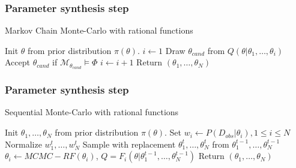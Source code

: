 \documentclass{beamer}
\begin{document}
\begin{frame}
    \frametitle{Parameter synthesis step}
    \begin{algorithm}[H]
        \caption{Markov Chain Monte-Carlo with rational functions}
        \label{rf-mcmc-alg}
        \begin{algorithmic}[1]
            \State Init $\theta$ from prior distribution $\pi(\theta)$.
            \State $i \leftarrow 1$
            \State Draw $\theta_{cand}$ from $Q(\theta|\theta_1,\ldots,\theta_i)$
            \State Accept $\theta_{cand}$ if $\mathcal{M}_{\theta_{cand}} \models \Phi$
            \State $i \leftarrow i + 1$
            \EndIf
            \EndWhile
            \State Return $(\theta_1,\ldots,\theta_N)$
            \EndProcedure
        \end{algorithmic}
    \end{algorithm}
\end{frame}


\begin{frame}
    \frametitle{Parameter synthesis step}
    \begin{algorithm}[H]
        \caption{Sequential Monte-Carlo with rational functions}
        \label{rf-smc-alg}
        \begin{algorithmic}[1]
            \State Init $\theta_1,\ldots,\theta_N$ from prior distribution $\pi(\theta)$.
            \State Set  $w_i \leftarrow P(D_{obs}|\theta_i), 1\leq i\leq N$
            \State Normalize $w^t_1,\ldots,w^t_N$
            \State Sample with replacement $\theta^t_1,\ldots,\theta^t_N$ from $\theta^{t-1}_1,\ldots,\theta^{t-1}_N$
            \State $\theta_i \leftarrow MCMC-RF(\theta_i)$, $Q = F_i(\theta|\theta^{t-1}_1,\ldots,\theta^{t-1}_N)$
            \EndFor
            \EndFor
            \State Return $(\theta_1,\ldots,\theta_N)$
            \EndProcedure
        \end{algorithmic}
    \end{algorithm}
\end{frame}
\end{document}
